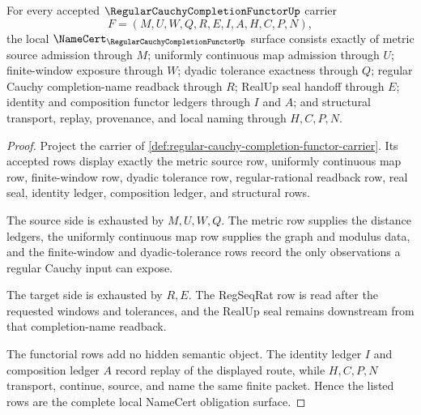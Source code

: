 \begin{theorem}
\label{thm:regular-cauchy-completion-functor-namecert-obligations}
For every accepted $\RegularCauchyCompletionFunctorUp$ carrier
$$
F=(M,U,W,Q,R,E,I,A,H,C,P,N),
$$
the local $\NameCert_{\RegularCauchyCompletionFunctorUp}$ surface consists exactly of metric source admission through $M$; uniformly continuous map admission through $U$; finite-window exposure through $W$; dyadic tolerance exactness through $Q$; regular Cauchy completion-name readback through $R$; RealUp seal handoff through $E$; identity and composition functor ledgers through $I$ and $A$; and structural transport, replay, provenance, and local naming through $H,C,P,N$.
\end{theorem}
\begin{proof}
Project the carrier of \autoref{def:regular-cauchy-completion-functor-carrier}. Its accepted rows display exactly the metric source row, uniformly continuous map row, finite-window row, dyadic tolerance row, regular-rational readback row, real seal, identity ledger, composition ledger, and structural rows.

The source side is exhausted by $M,U,W,Q$. The metric row supplies the distance ledgers, the uniformly continuous map row supplies the graph and modulus data, and the finite-window and dyadic-tolerance rows record the only observations a regular Cauchy input can expose.

The target side is exhausted by $R,E$. The RegSeqRat row is read after the requested windows and tolerances, and the RealUp seal remains downstream from that completion-name readback.

The functorial rows add no hidden semantic object. The identity ledger $I$ and composition ledger $A$ record replay of the displayed route, while $H,C,P,N$ transport, continue, source, and name the same finite packet. Hence the listed rows are the complete local NameCert obligation surface.
\end{proof}

